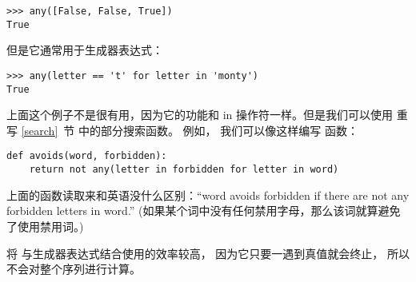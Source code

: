
\begin{lstlisting}
>>> any([False, False, True])
True
\end{lstlisting}


但是它通常用于生成器表达式：


\begin{lstlisting}
>>> any(letter == 't' for letter in 'monty')
True
\end{lstlisting}


上面这个例子不是很有用，因为它的功能和 in 操作符一样。但是我们可以使用  重写 \ref{search}~节 中的部分搜索函数。  例如， 我们可以像这样编写  函数：


\begin{lstlisting}
def avoids(word, forbidden):
    return not any(letter in forbidden for letter in word)
\end{lstlisting}


上面的函数读取来和英语没什么区别：``word avoids forbidden if there
are not any forbidden letters in word.''
(如果某个词中没有任何禁用字母，那么该词就算避免了使用禁用词。)


将  与生成器表达式结合使用的效率较高， 因为它只要一遇到真值就会终止， 所以不会对整个序列进行计算。


